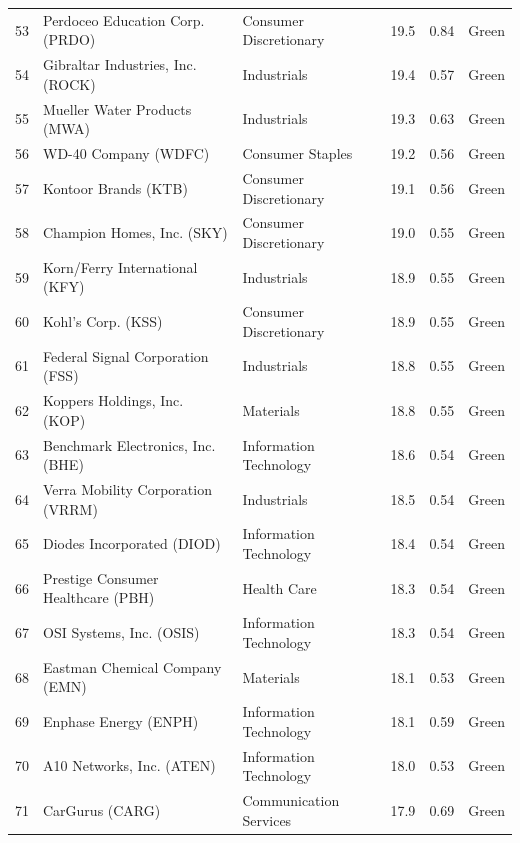 \documentclass[11pt,a4paper]{article}
\begin{document}
{\begin{longtable}{r p{4.6cm} p{3cm} r r l}
53 & Perdoceo Education Corp. (PRDO) & Consumer Discretionary & 19.5 & 0.84 & \cellcolor[HTML]{C6EFCE}Green \\
54 & Gibraltar Industries, Inc. (ROCK) & Industrials & 19.4 & 0.57 & \cellcolor[HTML]{C6EFCE}Green \\
55 & Mueller Water Products (MWA) & Industrials & 19.3 & 0.63 & \cellcolor[HTML]{C6EFCE}Green \\
56 & WD-40 Company (WDFC) & Consumer Staples & 19.2 & 0.56 & \cellcolor[HTML]{C6EFCE}Green \\
57 & Kontoor Brands (KTB) & Consumer Discretionary & 19.1 & 0.56 & \cellcolor[HTML]{C6EFCE}Green \\
58 & Champion Homes, Inc. (SKY) & Consumer Discretionary & 19.0 & 0.55 & \cellcolor[HTML]{C6EFCE}Green \\
59 & Korn/Ferry International (KFY) & Industrials & 18.9 & 0.55 & \cellcolor[HTML]{C6EFCE}Green \\
60 & Kohl's Corp. (KSS) & Consumer Discretionary & 18.9 & 0.55 & \cellcolor[HTML]{C6EFCE}Green \\
61 & Federal Signal Corporation (FSS) & Industrials & 18.8 & 0.55 & \cellcolor[HTML]{C6EFCE}Green \\
62 & Koppers Holdings, Inc. (KOP) & Materials & 18.8 & 0.55 & \cellcolor[HTML]{C6EFCE}Green \\
63 & Benchmark Electronics, Inc. (BHE) & Information Technology & 18.6 & 0.54 & \cellcolor[HTML]{C6EFCE}Green \\
64 & Verra Mobility Corporation (VRRM) & Industrials & 18.5 & 0.54 & \cellcolor[HTML]{C6EFCE}Green \\
65 & Diodes Incorporated (DIOD) & Information Technology & 18.4 & 0.54 & \cellcolor[HTML]{C6EFCE}Green \\
66 & Prestige Consumer Healthcare (PBH) & Health Care & 18.3 & 0.54 & \cellcolor[HTML]{C6EFCE}Green \\
67 & OSI Systems, Inc. (OSIS) & Information Technology & 18.3 & 0.54 & \cellcolor[HTML]{C6EFCE}Green \\
68 & Eastman Chemical Company (EMN) & Materials & 18.1 & 0.53 & \cellcolor[HTML]{C6EFCE}Green \\
69 & Enphase Energy (ENPH) & Information Technology & 18.1 & 0.59 & \cellcolor[HTML]{C6EFCE}Green \\
70 & A10 Networks, Inc. (ATEN) & Information Technology & 18.0 & 0.53 & \cellcolor[HTML]{C6EFCE}Green \\
71 & CarGurus (CARG) & Communication Services & 17.9 & 0.69 & \cellcolor[HTML]{C6EFCE}Green \\

\end{longtable}}
\end{document}
